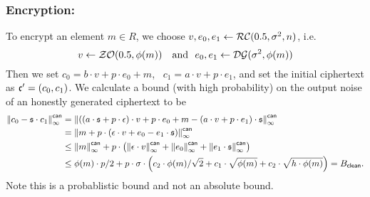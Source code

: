 \subsubsection{Encryption:}
To encrypt an element $m\in R$, we choose $v, e_0, e_1 \leftarrow \mathcal{RC}(0.5,\sigma^2,n)$, i.e.
\[
v \leftarrow \mathcal{ZO}(0.5, \phi(m)) ~~~\mbox{and}~~ e_0,e_1 \leftarrow \mathcal{DG}(\sigma^2,\phi(m)) 
\]
Then we set $c_0 = b \cdot v + p \cdot e_0+m$,~ $c_1=a\cdot v+p\cdot
e_1$, and set the initial ciphertext as $\mathfrak{c}'=(c_0,c_1)$.
We calculate a bound (with high probability) on the output noise of
an honestly generated ciphertext to be
\begin{align*}
  {\Vert c_0 - \mathfrak{s}\cdot c_1 \Vert}_\infty^{\mathsf{can}} 
     &= {\Vert ((a \cdot \mathfrak{s}+ p \cdot \epsilon) \cdot v +p \cdot e_0 +m
                - (a \cdot v+ p \cdot e_1) \cdot \mathfrak{s}  \Vert}_\infty^{\mathsf{can}} \\
     &= {\Vert m + p \cdot (\epsilon \cdot v +e_0 - e_1 \cdot \mathfrak{s}) \Vert}_\infty^{\mathsf{can}} \\
     &\le {\Vert m \Vert}_\infty^{\mathsf{can}} 
         +p \cdot \left( {\Vert \epsilon\cdot v \Vert}_\infty^{\mathsf{can}}
                       + {\Vert e_0 \Vert}_\infty^{\mathsf{can}}
                       + {\Vert e_1 \cdot \mathfrak{s} \Vert}_\infty^{\mathsf{can}}
                  \right) \\
     &\le \phi(m) \cdot p/2
	  + p \cdot \sigma \cdot 
             \left( c_2 \cdot \phi(m) / \sqrt{2}
			  + c_1 \cdot \sqrt{\phi(m)}
			  + c_2 \cdot \sqrt{h \cdot \phi(m)}
		    \right) = B_{\mathsf{clean}}.
\end{align*}
Note this is a probablistic bound and not an absolute bound.

\vspace{5mm}

